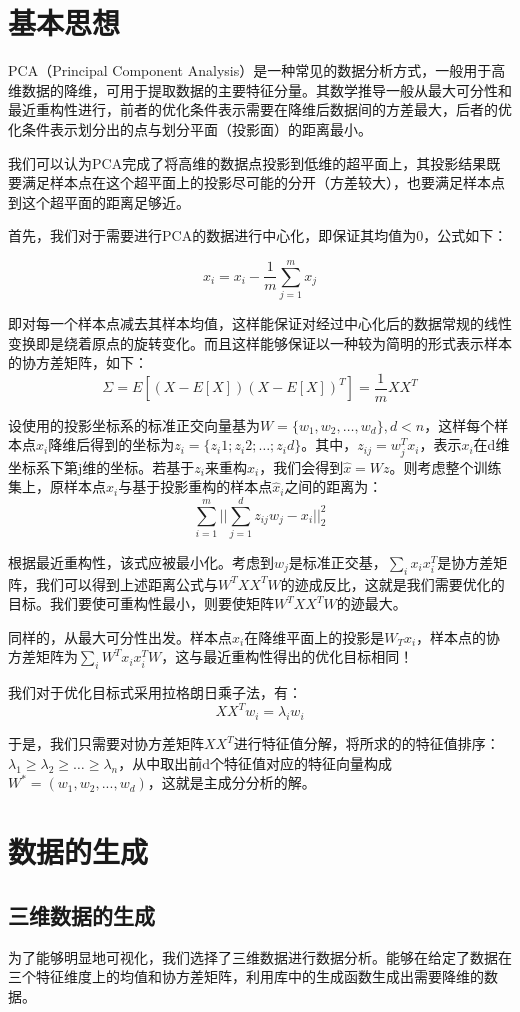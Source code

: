 \documentclass[12pt]{article}
\begin{document}
\section{基本思想}
PCA（Principal Component Analysis）是一种常见的数据分析方式，一般用于高维数据的降维，可用于提取数据的主要特征分量。其数学推导一般从最大可分性和最近重构性进行，前者的优化条件表示需要在降维后数据间的方差最大，后者的优化条件表示划分出的点与划分平面（投影面）的距离最小。\par
我们可以认为PCA完成了将高维的数据点投影到低维的超平面上，其投影结果既要满足样本点在这个超平面上的投影尽可能的分开（方差较大），也要满足样本点到这个超平面的距离足够近。\par
首先，我们对于需要进行PCA的数据进行中心化，即保证其均值为0，公式如下：\par
\[x_i=x_i-\frac{1}{m}\sum_{j=1}^mx_j\]\par
即对每一个样本点减去其样本均值，这样能保证对经过中心化后的数据常规的线性变换即是绕着原点的旋转变化。而且这样能够保证以一种较为简明的形式表示样本的协方差矩阵，如下：
\[\varSigma=E[(X-E[X])(X-E[X])^T]=\frac{1}{m}XX^T\]\par
设使用的投影坐标系的标准正交向量基为$W=\{w_1,w_2,\dots,w_d\},d<n$，这样每个样本点$x_i$降维后得到的坐标为$z_i=\{z_i1;z_i2;\dots;z_id\}$。其中，$z_{ij}=w_j^Tx_i$，表示$x_i$在d维坐标系下第j维的坐标。若基于$z_i$来重构$x_i$，我们会得到$\hat{x}=Wz$。则考虑整个训练集上，原样本点$x_i$与基于投影重构的样本点$\hat{x}_i$之间的距离为：
\[\sum_{i=1}^m||\sum_{j=1}^dz_{ij}w_j-x_i||_2^2\]\par
根据最近重构性，该式应被最小化。考虑到$w_j$是标准正交基，$\sum_{i}x_ix_i^T$是协方差矩阵，我们可以得到上述距离公式与$W^TXX^TW$的迹成反比，这就是我们需要优化的目标。我们要使可重构性最小，则要使矩阵$W^TXX^TW$的迹最大。\par
同样的，从最大可分性出发。样本点$x_i$在降维平面上的投影是$W_Tx_i$，样本点的协方差矩阵为$\sum_iW^Tx_ix_i^TW$，这与最近重构性得出的优化目标相同！\par
我们对于优化目标式采用拉格朗日乘子法，有：
\[XX^Tw_i=\lambda_iw_i\]\par
于是，我们只需要对协方差矩阵$XX^T$进行特征值分解，将所求的的特征值排序：$\lambda_1\geq\lambda_2\geq\dots\geq\lambda_n$，从中取出前d个特征值对应的特征向量构成$W^*=(w_1,w_2,...,w_d)$，这就是主成分分析的解。\par
\section{数据的生成}
\subsection{三维数据的生成}
为了能够明显地可视化，我们选择了三维数据进行数据分析。能够在给定了数据在三个特征维度上的均值和协方差矩阵，利用库中的生成函数生成出需要降维的数据。
\end{document}
